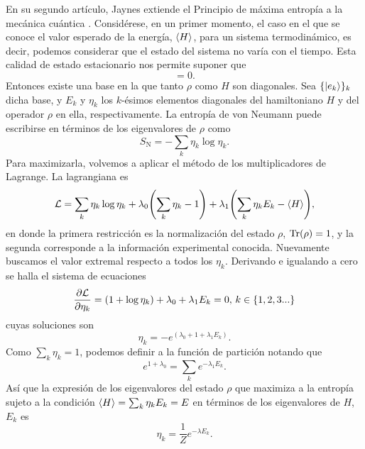 En su segundo artículo, Jaynes extiende el Principio de máxima entropía a la mecánica cuántica \cite{JaynesII}. Considérese, en un primer momento, el caso en el que se conoce el valor esperado de la energía, $\expval{H}$, para un sistema termodinámico, es decir, podemos considerar que el estado del sistema no varía con el tiempo. Esta calidad de estado estacionario nos permite suponer que
\begin{equation}
    [\rho,H]=0.\nonumber
\end{equation}
Entonces existe una base en la que tanto $\rho$ como $H$ son diagonales. Sea $\{\ket{e_{k}}\}_{k}$ dicha base, y $E_{k}$ y $\eta_{k}$ los $k$-ésimos elementos diagonales del hamiltoniano $H$ y del operador $\rho$ en ella, respectivamente. La entropía de von Neumann puede escribirse en términos de los eigenvalores de $\rho$ como
\begin{equation}
    S_{\text{N}}=-\sum_{k}\eta_{k}\log{\eta_{k}}.\nonumber
\end{equation}
Para maximizarla, volvemos a aplicar el método de los multiplicadores de Lagrange. La lagrangiana es
\begin{equation}
    \mathcal{L}=\sum_{k}\eta_{k}\log{\eta_{k}}+\lambda_{0}\qty(\sum_{k}\eta_{k}-1)+\lambda_{1}\qty(\sum_{k}\eta_{k}E_{k}-\expval{H}),\nonumber
\end{equation}
en donde la primera restricción es la normalización del estado $\rho$, $\Tr(\rho)=1$, y la segunda corresponde a la información experimental conocida. Nuevamente buscamos el valor extremal respecto a todos los $\eta_{k}$. Derivando e igualando a cero se halla el sistema de ecuaciones
\begin{equation}
    \frac{\partial \mathcal{L}}{\partial \eta_{k}}=(1+\log{\eta_{k}})+\lambda_{0}+\lambda_{1}E_{k}=0, \,k\in\{1,2,3...\}\nonumber
\end{equation}
cuyas soluciones son
\begin{equation}
    \eta_{k}=-e^{(\lambda_{0}+1+\lambda_{1}E_{k})}.\nonumber
\end{equation}
Como $\sum_{k}\eta_{k}=1$, podemos definir a la función de partición notando que
\begin{equation}
    e^{1+\lambda_{0}}=\sum_{k}e^{-\lambda_{1}E_{k}}.\nonumber
\end{equation}
Así que la expresión de los eigenvalores del estado $\rho$ que maximiza a la entropía sujeto a la condición $\expval{H}=\sum_{k}\eta_{k}E_{k}=E$ en términos de los eigenvalores de $H$, $E_{k}$ es
\begin{equation}
    \eta_{k}=\frac{1}{Z}e^{-\lambda E_{k}}.\nonumber
\end{equation}
